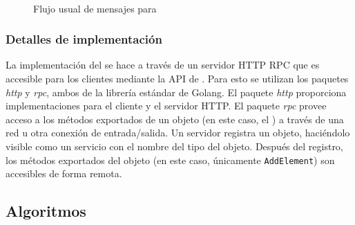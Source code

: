 \begin{figure}
  \\
  \caption{Flujo usual de mensajes para \compresschain}
  \label{fig:compresschain-flow}
\end{figure}

\subsubsection{Detalles de implementación}
La implementación del \collector se hace a través de un servidor HTTP RPC que es accesible para los clientes
mediante la API de \setchain.
%
Para esto se utilizan los paquetes \textit{http} y \textit{rpc}, ambos de la librería estándar de Golang.
%
El paquete \textit{http} proporciona implementaciones para el cliente y el servidor HTTP.
%
El paquete \textit{rpc} provee acceso a los métodos exportados de un objeto (en este caso, el \collector)
a través de una red u otra conexión de entrada/salida.
%
Un servidor registra un objeto, haciéndolo visible como un servicio con el nombre del tipo del objeto.
%
Después del registro, los métodos exportados del objeto (en este caso, únicamente \texttt{AddElement}) son accesibles de forma remota.


\subsection{Algoritmos}\label{subsec:compresschain-algorithms}
%
%

